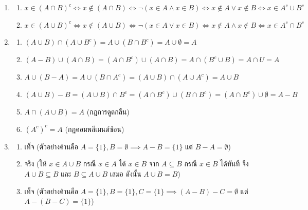 \begin{enumerate}[resume*=anskey]
    \item
    \begin{enumerate}[label=\textbf{\thechapter.\arabic{enumi}.\arabic*}]
        \item $x \in (A \cap B)^c \iff x \notin (A \cap B) \iff \neg(x \in A \land x \in B) \iff x \notin A \lor x \notin B \iff x \in A^c \cup B^c$
        \item $x \in (A \cup B)^c \iff x \notin (A \cup B) \iff \neg(x \in A \lor x \in B) \iff x \notin A \land x \notin B \iff x \in A^c \cap B^c$
    \end{enumerate}

    \item
    \begin{enumerate}[label=\textbf{\thechapter.\arabic{enumi}.\arabic*}]
        \item $(A \cup B) \cap (A \cup B^c) = A \cup (B \cap B^c) = A \cup \emptyset = A$
        \item $(A - B) \cup (A \cap B) = (A \cap B^c) \cup (A \cap B) = A \cap (B^c \cup B) = A \cap U = A$
        \item $A \cup (B - A) = A \cup (B \cap A^c) = (A \cup B) \cap (A \cup A^c) = A \cup B$
        \item $(A \cup B) - B = (A \cup B) \cap B^c = (A \cap B^c) \cup (B \cap B^c) = (A \cap B^c) \cup \emptyset = A - B$
        \item $A \cap (A \cup B) = A$ (กฎการดูดกลืน)
        \item $(A^c)^c = A$ (กฎคอมพลีเมนต์ซ้อน)
    \end{enumerate}

    \item
    \begin{enumerate}[label=\textbf{\thechapter.\arabic{enumi}.\arabic*}]
        \item เท็จ (ตัวอย่างค้านคือ $A=\{1\}, B=\emptyset \implies A-B=\{1\}$ แต่ $B-A=\emptyset$)
        \item จริง (ให้ $x \in A \cup B$ กรณี $x \in A$ ได้ $x \in B$ จาก $A \subseteq B$ กรณี $x \in B$ ได้ทันที จึง $A \cup B \subseteq B$ และ $B \subseteq A \cup B$ เสมอ ดังนั้น $A \cup B = B$)
        \item เท็จ (ตัวอย่างค้านคือ $A=\{1\}, B=\{1\}, C=\{1\} \implies (A-B)-C=\emptyset$ แต่ $A-(B-C)=\{1\}$)
    \end{enumerate}
\end{enumerate}

